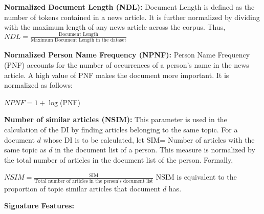 \documentclass[a4paper,man,natbib]{apa6}
\begin{document}
\noindent \textbf{Normalized Document Length (NDL): } 
Document Length is defined as the number of tokens contained in a news article. It is further normalized by dividing with the maximum length of any news article across the corpus. Thus,  
$NDL= \frac{\text{Document Length}} {\text{Maximum Document Length in the dataset}}$


\noindent \textbf{ Normalized Person Name Frequency (NPNF): }
Person Name Frequency (PNF) accounts for the number of occurrences of a person's name in the news article. A high value of PNF makes the document more important. It is normalized as follows:

\begin{center}
$NPNF=	1+\log$(PNF)
\end{center}

\noindent \textbf{Number of similar articles (NSIM): }
This parameter is used in the calculation of the DI by finding articles belonging to the same topic. 
For a document $d$ whose DI is to be calculated, let  SIM= Number of articles with the same topic as $d$ in the document list of a person.
This measure is normalized by the total number of articles in the document list of the person. Formally,

$NSIM= \frac{\text{SIM}} {\text{Total number of articles in the person's document list}}$
NSIM is equivalent to the proportion of topic similar articles that document $d$ has.

\noindent \textbf{Signature Features: }
\end{document}
